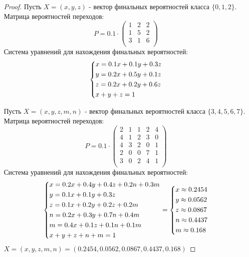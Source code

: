 \begin{proof}
	Пусть $X = (x, y, z)$ - вектор финальных вероятностей класса $\{0, 1, 2\}$.
	\newline
	Матрица вероятностей переходов:
	\[
		P = 0.1 \cdot
		\begin{pmatrix}
			1 & 2 & 2\\
			1 & 5 & 2\\
			3 & 1 & 6\\
		\end{pmatrix}
	\]
	Система уравнений для нахождения финальных вероятностей:
	\[	
		\begin{dcases}
			x = 0.1x + 0.1y + 0.3z\\
			y = 0.2x + 0.5y + 0.1z\\
			z = 0.2x + 0.2y + 0.6z\\
			x + y + z = 1
		\end{dcases}
	\]
	
	Пусть $X = (x, y, z, m, n)$ - вектор финальных вероятностей класса $\{3, 4, 5, 6, 7\}$.
	\newline
	Матрица вероятностей переходов:
	\[
		P = 0.1 \cdot
		\begin{pmatrix}
			2 & 1 & 1 & 2 & 4\\
			4 & 1 & 2 & 3 & 0\\
			4 & 3 & 2 & 0 & 1\\
			2 & 0 & 0 & 7 & 1\\
			3 & 0 & 2 & 4 & 1\\
		\end{pmatrix}
	\]
	Система уравнений для нахождения финальных вероятностей:
	\[
		\begin{dcases}
			x = 0.2x + 0.4y + 0.4z + 0.2n + 0.3m\\
			y = 0.1x + 0.1y + 0.3z\\
			z = 0.1x + 0.2y + 0.2z + 0.2m\\
			n = 0.2x + 0.3y + 0.7n + 0.4m\\
			m = 0.4x + 0.1z + 0.1n + 0.1m\\
			x + y + z + n + m = 1
		\end{dcases}
		=
		\begin{dcases}
			x \approx 0.2454\\
			y \approx 0.0562\\
			z \approx 0.0867\\
			n \approx 0.4437\\
			m \approx 0.168
		\end{dcases}
	\]
	$X = (x, y, z, m, n) = (0.2454, 0.0562, 0.0867, 0.4437, 0.168)$
\end{proof}

